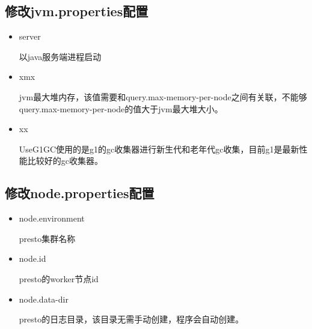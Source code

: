 \documentclass[letterpaper,10pt,english]{sphinxmanual}
\begin{document}
\subsection{修改jvm.properties配置}
\label{\detokenize{installation/standardlone:jvm-properties}}
\noindent{}
\begin{itemize}
\item {} 
server

以java服务端进程启动

\item {} 
xmx

jvm最大堆内存，该值需要和query.max-memory-per-node之间有关联，不能够query.max-memory-per-node的值大于jvm最大堆大小。

\end{itemize}

\begin{sphinxVerbatim}[commandchars=\\\{\}]
  
  
\end{sphinxVerbatim}
\begin{itemize}
\item {} 
xx

UseG1GC使用的是g1的gc收集器进行新生代和老年代gc收集，目前g1是最新性能比较好的gc收集器。

\end{itemize}


\subsection{修改node.properties配置}
\label{\detokenize{installation/standardlone:node-properties}}
\noindent{}
\begin{itemize}
\item {} 
node.environment

presto集群名称

\item {} 
node.id

presto的worker节点id

\item {} 
node.data-dir

presto的日志目录，该目录无需手动创建，程序会自动创建。

\end{itemize}
\end{document}
